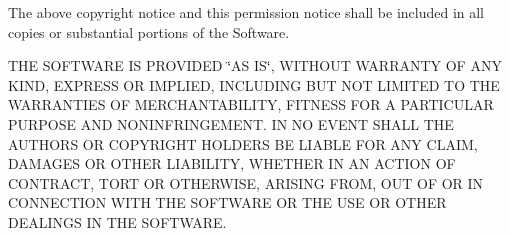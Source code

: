 \-The above copyright notice and this permission notice shall be included in all copies or substantial portions of the \-Software.

\-T\-H\-E \-S\-O\-F\-T\-W\-A\-R\-E \-I\-S \-P\-R\-O\-V\-I\-D\-E\-D \char`\"{}\-A\-S I\-S\char`\"{}, \-W\-I\-T\-H\-O\-U\-T \-W\-A\-R\-R\-A\-N\-T\-Y \-O\-F \-A\-N\-Y \-K\-I\-N\-D, \-E\-X\-P\-R\-E\-S\-S \-O\-R \-I\-M\-P\-L\-I\-E\-D, \-I\-N\-C\-L\-U\-D\-I\-N\-G \-B\-U\-T \-N\-O\-T \-L\-I\-M\-I\-T\-E\-D \-T\-O \-T\-H\-E \-W\-A\-R\-R\-A\-N\-T\-I\-E\-S \-O\-F \-M\-E\-R\-C\-H\-A\-N\-T\-A\-B\-I\-L\-I\-T\-Y, \-F\-I\-T\-N\-E\-S\-S \-F\-O\-R \-A \-P\-A\-R\-T\-I\-C\-U\-L\-A\-R \-P\-U\-R\-P\-O\-S\-E \-A\-N\-D \-N\-O\-N\-I\-N\-F\-R\-I\-N\-G\-E\-M\-E\-N\-T. \-I\-N \-N\-O \-E\-V\-E\-N\-T \-S\-H\-A\-L\-L \-T\-H\-E \-A\-U\-T\-H\-O\-R\-S \-O\-R \-C\-O\-P\-Y\-R\-I\-G\-H\-T \-H\-O\-L\-D\-E\-R\-S \-B\-E \-L\-I\-A\-B\-L\-E \-F\-O\-R \-A\-N\-Y \-C\-L\-A\-I\-M, \-D\-A\-M\-A\-G\-E\-S \-O\-R \-O\-T\-H\-E\-R \-L\-I\-A\-B\-I\-L\-I\-T\-Y, \-W\-H\-E\-T\-H\-E\-R \-I\-N \-A\-N \-A\-C\-T\-I\-O\-N \-O\-F \-C\-O\-N\-T\-R\-A\-C\-T, \-T\-O\-R\-T \-O\-R \-O\-T\-H\-E\-R\-W\-I\-S\-E, \-A\-R\-I\-S\-I\-N\-G \-F\-R\-O\-M, \-O\-U\-T \-O\-F \-O\-R \-I\-N \-C\-O\-N\-N\-E\-C\-T\-I\-O\-N \-W\-I\-T\-H \-T\-H\-E \-S\-O\-F\-T\-W\-A\-R\-E \-O\-R \-T\-H\-E \-U\-S\-E \-O\-R \-O\-T\-H\-E\-R \-D\-E\-A\-L\-I\-N\-G\-S \-I\-N \-T\-H\-E \-S\-O\-F\-T\-W\-A\-R\-E. 

